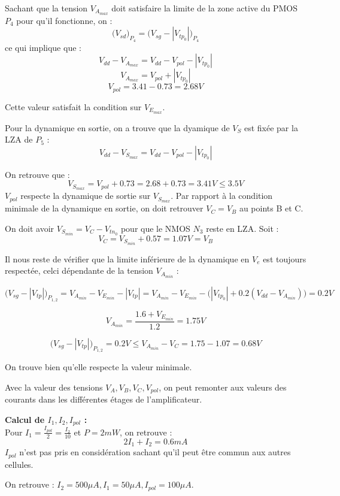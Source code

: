 \documentclass[11pt]{article}
\begin{document}
Sachant que la tension $V_{A_{max}}$ doit satisfaire la limite de la zone active du PMOS $P_4$ pour qu'il
fonctionne, on :
\[
\Big(V_{sd}\Big)_{P_{4}} = \Big(V_{sg} - | V_{tp_{0}} | \Big)_{P_4} 
\]
ce qui implique que : 
\[
V_{dd} - V_{A_{max}} = V_{dd} - V_{pol} - |V_{tp_0}|
\]
\[
V_{A_{max}} = V_{pol} + |V_{tp_0}|
\]
\[
V_{pol} = 3.41 - 0.73 = 2.68 V
\]

Cette valeur satisfait la condition sur $V_{E_{max}}$.

Pour la dynamique en sortie, on a trouve que la dyamique de $V_S$ est fix\'ee par la LZA de $P_5$ :
\[
V_{dd} - V_{S_{max}} = V_{dd} - V_{pol} - |V_{tp_0}|
\]

On retrouve que :
\[
V_{S_{max}} = V_{pol} + 0.73 = 2.68+0.73 = 3.41 V \leq 3.5 V 
\]
$V_{pol}$ respecte la dynamique de sortie sur $V_{S_{max}}$. Par rapport \`a la condition minimale de la
dynamique en sortie, on doit retrouver $V_C = V_B$ au points B et C.

On doit avoir $V_{S_{min}} = V_C - V_{tn_0}$ pour que le NMOS $N_3$ reste en LZA.
Soit :
\[
V_C = V_{S_{min}} + 0.57 = 1.07 V = V_B
\]

Il nous reste de v\'erifier que la limite inf\'erieure de la dynamique en $V_e$ est toujours respect\'ee,
celci d\'ependante de la tension $V_{A_{min}}$ :

\[
\bigg( V_{sg} - | V_{tp} | \bigg)_{P_{1,2}} = V_{A_{min}} - V_{E_{min}} - |V_{tp}| = V_{A_{min}} - V_{E_{min}} -
\Big( | V_{tp_{0}} | + 0.2(V_{dd} - V_{A_{min}})\Big) = 0.2V
\]

\[
V_{A_{min}} = \frac{1.6 + V_{E_{min}}}{1.2} = 1.75 V
\]

\[
\bigg( V_{sg} - | V_{tp} | \bigg)_{P_{1,2}} = 0.2V \leq V_{A_{min}} - V_C = 1.75 - 1.07 = 0.68 V
\]

On trouve bien qu'elle respecte la valeur minimale.

\clearpage

Avec la valeur des tensions $V_{A}, V_{B}, V_{C}, V_{pol}$, on peut remonter aux valeurs des courants dans
les diff\'erentes \'etages de l'amplificateur.

\textbf{Calcul de $I_1, I_2, I_{pol}$ :} \\
Pour $I_1 = \frac{I_{pol}}{2} = \frac{I_{2}}{10}$ et $P = 2 mW$, on retrouve :
\[
2I_1 + I_2 = 0.6 mA
\]
$I_{pol}$ n'est pas pris en consid\'eration sachant qu'il peut \^etre commun aux autres cellules.

On retrouve : $ I_2 = 500 \mu A, I_1 = 50 \mu A, I_{pol} = 100 \mu A$.
\end{document}
